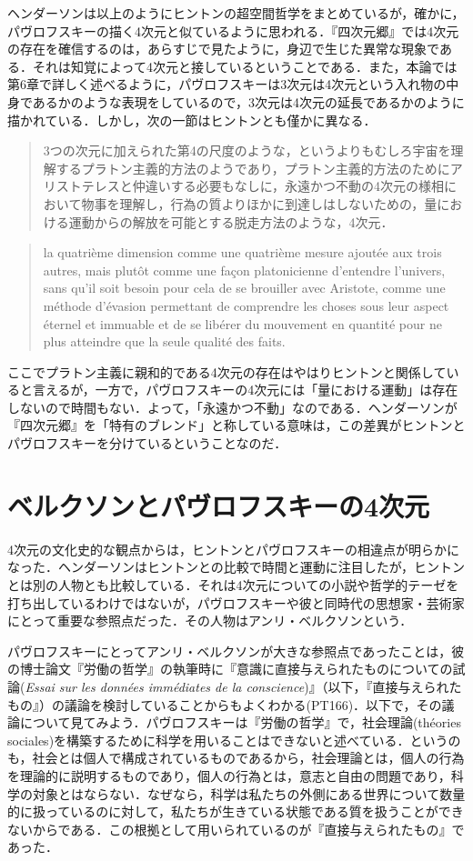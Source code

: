 ヘンダーソンは以上のようにヒントンの超空間哲学をまとめているが，確かに，パヴロフスキーの描く4次元と似ているように思われる．『四次元郷』では4次元の存在を確信するのは，あらすじで見たように，身辺で生じた異常な現象である．それは知覚によって4次元と接しているということである．また，本論では第6章で詳しく述べるように，パヴロフスキーは3次元は4次元という入れ物の中身であるかのような表現をしているので，3次元は4次元の延長であるかのように描かれている．しかし，次の一節はヒントンとも僅かに異なる．
\begin{quote}
3つの次元に加えられた第4の尺度のような，というよりもむしろ宇宙を理解するプラトン主義的方法のようであり，プラトン主義的方法のためにアリストテレスと仲違いする必要もなしに，永遠かつ不動の4次元の様相において物事を理解し，行為の質よりほかに到達しはしないための，量における運動からの解放を可能とする脱走方法のような，4次元．
\end{quote}
\begin{quote}
la quatrième dimension comme une quatrième mesure ajoutée aux trois autres, mais plutôt comme une façon platonicienne d'entendre l'univers, sans qu'il soit besoin pour cela de se brouiller avec Aristote, comme une méthode d'évasion permettant de comprendre les choses sous leur aspect éternel et immuable et de se libérer du mouvement en quantité pour ne plus atteindre que la seule qualité des faits.
\end{quote}
ここでプラトン主義に親和的である4次元の存在はやはりヒントンと関係していると言えるが，一方で，パヴロフスキーの4次元には「量における運動」は存在しないので時間もない．よって，「永遠かつ不動」なのである．ヘンダーソンが『四次元郷』を「特有のブレンド」と称している意味は，この差異がヒントンとパヴロフスキーを分けているということなのだ．

\section{ベルクソンとパヴロフスキーの4次元}
4次元の文化史的な観点からは，ヒントンとパヴロフスキーの相違点が明らかになった．ヘンダーソンはヒントンとの比較で時間と運動に注目したが，ヒントンとは別の人物とも比較している．それは4次元についての小説や哲学的テーゼを打ち出しているわけではないが，パヴロフスキーや彼と同時代の思想家・芸術家にとって重要な参照点だった．その人物はアンリ・ベルクソンという．

パヴロフスキーにとってアンリ・ベルクソンが大きな参照点であったことは，彼の博士論文『労働の哲学』の執筆時に『意識に直接与えられたものについての試論(\emph{Essai sur les données immédiates de la conscience})』（以下，『直接与えられたもの』）の議論を検討していることからもよくわかる(PT166)．以下で，その議論について見てみよう．パヴロフスキーは『労働の哲学』で，社会理論(théories sociales)を構築するために科学を用いることはできないと述べている．というのも，社会とは個人で構成されているものであるから，社会理論とは，個人の行為を理論的に説明するものであり，個人の行為とは，意志と自由の問題であり，科学の対象とはならない．なぜなら，科学は私たちの外側にある世界について数量的に扱っているのに対して，私たちが生きている状態である質を扱うことができないからである．この根拠として用いられているのが『直接与えられたもの』であった．

